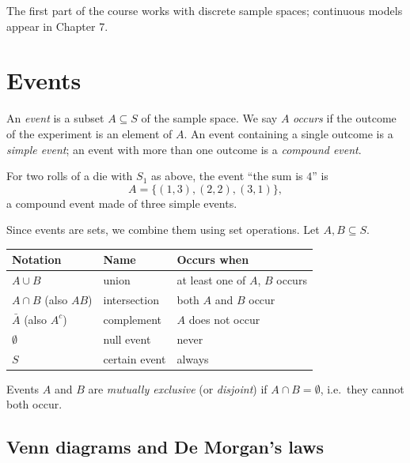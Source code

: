 The first part of the course works with discrete sample spaces; continuous models appear
in Chapter 7.

\section{Events}

\begin{definition}[Event]
An \emph{event} is a subset $A \subseteq S$ of the sample space. We say $A$
\emph{occurs} if the outcome of the experiment is an element of $A$. An event containing a
single outcome is a \emph{simple event}; an event with more than one outcome is a
\emph{compound event}.
\end{definition}

\begin{example}
For two rolls of a die with $S_1$ as above, the event ``the sum is $4$'' is
\[
  A = \{(1,3),(2,2),(3,1)\},
\]
a compound event made of three simple events.
\end{example}

Since events are sets, we combine them using set operations. Let $A, B \subseteq S$.

\begin{center}
\begin{tabular}{lll}
\toprule
Notation & Name & Occurs when \\
\midrule
$A \cup B$ & union & at least one of $A$, $B$ occurs \\
$A \cap B$ (also $AB$) & intersection & both $A$ and $B$ occur \\
$\bar A$ (also $A^c$) & complement & $A$ does not occur \\
$\emptyset$ & null event & never \\
$S$ & certain event & always \\
\bottomrule
\end{tabular}
\end{center}

\begin{definition}
Events $A$ and $B$ are \emph{mutually exclusive} (or \emph{disjoint}) if
$A \cap B = \emptyset$, i.e.\ they cannot both occur.
\end{definition}

\subsection{Venn diagrams and De Morgan's laws}

